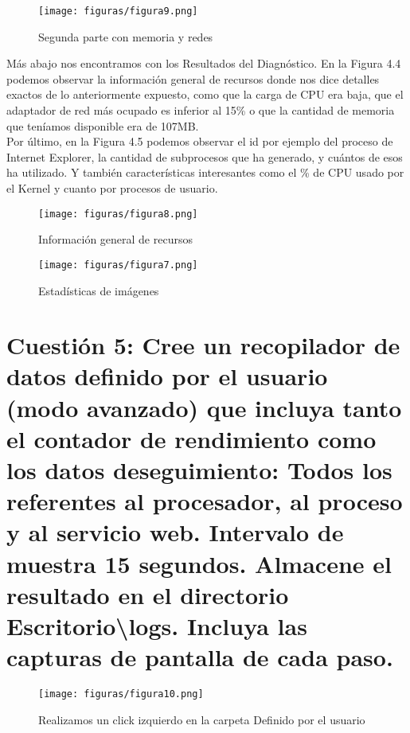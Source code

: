 \begin{figure}[H] %
	\centering
	\texttt{[image: figuras/figura9.png]}  %
	\label{figura9}
	
	\caption{Segunda parte con memoria y redes} 
\end{figure}

Más abajo nos encontramos con los Resultados del Diagnóstico. En la Figura 4.4  podemos observar la información general de recursos donde nos dice detalles exactos de lo anteriormente expuesto, como que la carga de CPU era baja, que el adaptador de red más ocupado es inferior al 15\% o que la cantidad de memoria que teníamos disponible era de 107MB.\\
Por último, en la Figura 4.5 podemos observar el id por ejemplo del proceso de Internet Explorer, la cantidad de subprocesos que ha generado, y cuántos de esos ha utilizado. Y también características interesantes como el \% de CPU usado por el Kernel y cuanto por procesos de usuario.
\begin{figure}[H] %
	\centering
	\texttt{[image: figuras/figura8.png]}  %
	\label{figura8}
	
	\caption{Información general de recursos} 
\end{figure}
\begin{figure}[H] %
	\centering
	\texttt{[image: figuras/figura7.png]}  %
	\label{figura7}
	
	\caption{Estadísticas de imágenes} 
\end{figure}


\section{Cuestión 5: Cree un recopilador de datos definido por el usuario (modo avanzado) que incluya tanto el contador de rendimiento como los datos deseguimiento: Todos los referentes al procesador, al proceso y al servicio web. Intervalo de muestra 15 segundos. Almacene el resultado en el directorio Escritorio\textbackslash logs. Incluya las capturas de pantalla de cada paso.}
\begin{figure}[H] %
	\centering
	\texttt{[image: figuras/figura10.png]}  %
	\label{figura10}
	
	\caption{Realizamos un click izquierdo en la carpeta Definido por el usuario} 
\end{figure}

